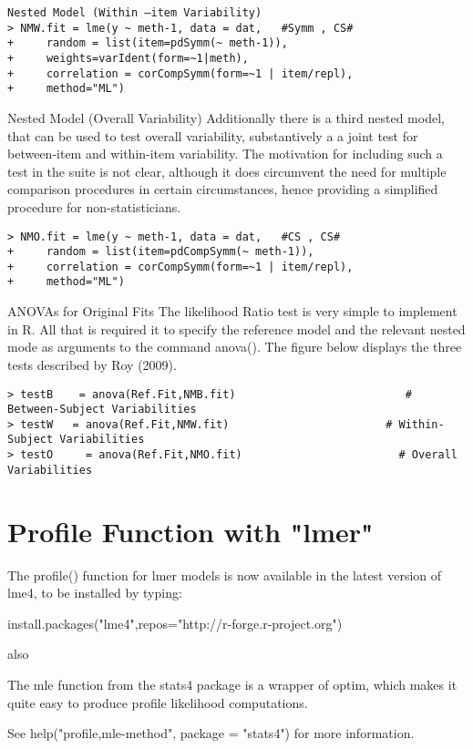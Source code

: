 \documentclass[12pt, a4paper]{report}
\theoremstyle{plain}
\theoremstyle{definition}
\theoremstyle{remark}
\begin{document}
\begin{verbatim}
Nested Model (Within –item Variability)
> NMW.fit = lme(y ~ meth-1, data = dat,   #Symm , CS# 
+     random = list(item=pdSymm(~ meth-1)),
+     weights=varIdent(form=~1|meth), 
+     correlation = corCompSymm(form=~1 | item/repl), 
+     method="ML")
\end{verbatim}


Nested Model (Overall Variability)
Additionally there is a third nested model, that can be used to test overall variability, substantively a a joint test for between-item and within-item variability. The motivation for including such a test in the suite is not clear, although it does circumvent the need for multiple comparison procedures in certain circumstances, hence providing a simplified procedure for non-statisticians.
\begin{verbatim}
> NMO.fit = lme(y ~ meth-1, data = dat,   #CS , CS# 
+     random = list(item=pdCompSymm(~ meth-1)), 
+     correlation = corCompSymm(form=~1 | item/repl), 
+     method="ML")
\end{verbatim}

ANOVAs  for  Original Fits
The likelihood Ratio test is very simple to implement in R. All that is required it to specify the reference model and the relevant nested mode as arguments to the command anova().
The figure below displays the three tests described by Roy (2009).
\begin{verbatim}
> testB    = anova(Ref.Fit,NMB.fit)                          # Between-Subject Variabilities
> testW   = anova(Ref.Fit,NMW.fit)                        # Within-Subject Variabilities
> testO     = anova(Ref.Fit,NMO.fit)                        # Overall Variabilities
\end{verbatim}
\newpage
\section{Profile Function with "lmer"}

The profile() function for lmer models is now available in the latest version of lme4, to be installed by typing:

install.packages("lme4",repos="http://r-forge.r-project.org")

also

The mle function from the stats4 package is a wrapper of optim, which makes it quite easy to produce 
profile likelihood computations. 

See help("profile,mle-method", package = "stats4") for more information.
\end{document}
